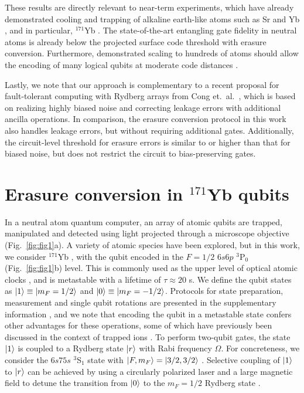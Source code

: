 \documentclass[%
reprint,
superscriptaddress,
 amsmath,amssymb,
 aps,
 prx,
floatfix,
]{revtex4-1}
\begin{document}
These results are directly relevant to near-term experiments, which have already demonstrated cooling and trapping of alkaline earth-like atoms such as Sr and Yb \cite{Norcia2018,Cooper2018,Saskin2019,barnes2021}, and in particular, $^{171}$Yb \cite{ma2021,jenkins2021}. The state-of-the-art entangling gate fidelity in neutral atoms \cite{Levine2019,madjarov2020} is already below the projected surface code threshold with erasure conversion. Furthermore, demonstrated scaling to hundreds of atoms should allow the encoding of many logical qubits at moderate code distances \cite{ebadi2021,scholl2021}.

Lastly, we note that our approach is complementary to a recent proposal for fault-tolerant computing with Rydberg arrays from Cong et.~al.~\cite{cong2021}, which is based on realizing highly biased noise and correcting leakage errors with additional ancilla operations. In comparison, the erasure conversion protocol in this work also handles leakage errors, but without requiring additional gates. Additionally, the circuit-level threshold for erasure errors is similar to or higher than that for biased noise, but does not restrict the circuit to bias-preserving gates.

\section{Erasure conversion in ${}^{171}$Yb qubits}
In a neutral atom quantum computer, an array of atomic qubits are trapped, manipulated and detected using light projected through a microscope objective (Fig.~\ref{fig:fig1}a). A variety of atomic species have been explored, but in this work, we consider ${}^{171}$Yb \cite{ma2021,jenkins2021}, with the qubit encoded in the $F=1/2$ $6s6p$ ${}^{3}$P$_{0}$ (Fig.~\ref{fig:fig1}b) level. This is commonly used as the upper level of optical atomic clocks \cite{ludlow2015}, and is metastable with a lifetime of $\tau\approx20$ s. We define the qubit states as $\ket{1} \equiv \ket{m_F=1/2}$ and $\ket{0} \equiv \ket{m_F=-1/2}$. Protocols for state preparation, measurement and single qubit rotations are presented in the supplementary information \cite{SI}, and we note that encoding the qubit in a metastable state confers other advantages for these operations, some of which have previously been discussed in the context of trapped ions \cite{allcock2021}. To perform two-qubit gates, the state $\ket{1}$ is coupled to a Rydberg state $\ket{r}$ with Rabi frequency $\Omega$. For concreteness, we consider the $6s75s$ $^3$S$_1$ state with $\ket{F,m_F} = \ket{3/2,3/2}$ \cite{Wilson2019}. Selective coupling of $\ket{1}$ to $\ket{r}$ can be achieved by using a circularly polarized laser and a large magnetic field to detune the transition from $\ket{0}$ to the $m_F=1/2$ Rydberg state \cite{ma2021}.
\end{document}
